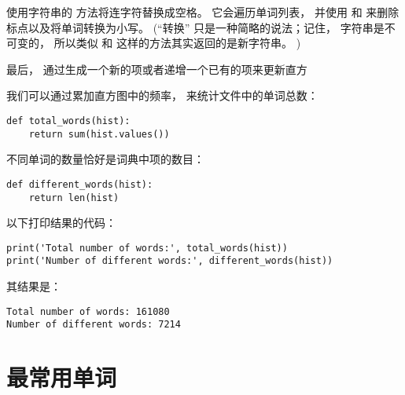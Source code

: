  使用字符串的  方法将连字符替换成空格。
它会遍历单词列表， 并使用  和  来删除标点以及将单词转换为小写。
(``转换'' 只是一种简略的说法；记住， 字符串是不可变的， 所以类似  和  这样的方法其实返回的是新字符串。  )


最后，  通过生成一个新的项或者递增一个已有的项来更新直方



我们可以通过累加直方图中的频率， 来统计文件中的单词总数：

\begin{lstlisting}
def total_words(hist):
    return sum(hist.values())
\end{lstlisting}

%

不同单词的数量恰好是词典中项的数目：

\begin{lstlisting}
def different_words(hist):
    return len(hist)
\end{lstlisting}


以下打印结果的代码：

\begin{lstlisting}
print('Total number of words:', total_words(hist))
print('Number of different words:', different_words(hist))
\end{lstlisting}


其结果是：

\begin{lstlisting}
Total number of words: 161080
Number of different words: 7214
\end{lstlisting}

%
\section{最常用单词}

